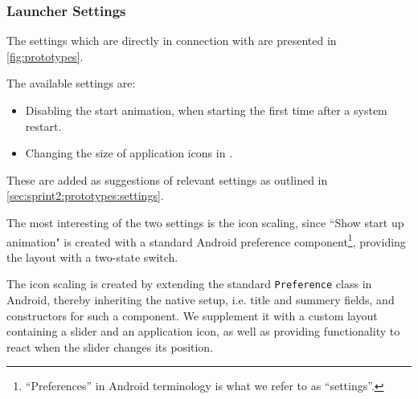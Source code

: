 \subsubsection{Launcher Settings}
The settings which are directly in connection with \launcher are presented in \cref{fig:prototypes}.

The available settings are:
\begin{itemize}
 	\item Disabling the start animation, when starting \launcher the first time after a system restart.
 	\item Changing the size of application icons in  \homeactivity.
\end{itemize} 

These are added as suggestions of relevant \launcher settings as outlined in \cref{sec:sprint2:prototypes:settings}.

The most interesting of the two settings is the icon scaling, since ``Show start up animation" is created with a standard Android preference component\footnote{``Preferences'' in Android terminology is what we refer to as ``settings''.}, providing the layout with a two-state switch.

The icon scaling is created by extending the standard \lstinline|Preference| class in Android, thereby inheriting the native setup, i.e. title and summery fields, and constructors for such a component.
We supplement it with a custom layout containing a slider and an application icon, as well as providing functionality to react when the slider changes its position.
